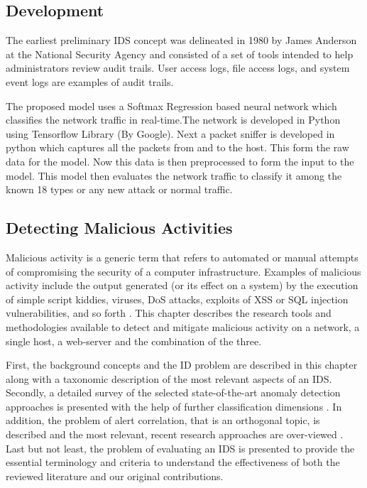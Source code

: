 \documentclass[12pt]{article}
\theoremstyle{definition}
\begin{document}
		
		\subsection{Development}
		The earliest preliminary IDS concept was delineated in 1980 by James Anderson at the National Security Agency and consisted of a set of tools intended to help administrators review audit trails. User access logs, file access logs, and system event logs are examples of audit trails.
		
		The proposed model uses a Softmax Regression based neural network which classifies the network traffic in real-time.The network is developed in Python using Tensorflow Library (By Google). Next a packet sniffer is developed in python which captures all the packets from and to the host. This form the raw data for the model. Now this data is then preprocessed to form the input to the model. This model then evaluates the network traffic to classify it among the known 18 types or any new attack or normal traffic.
			
		\subsection{Detecting Malicious Activities}
		Malicious activity is a generic term that refers to automated or manual attempts of compromising the security of a computer infrastructure. Examples of malicious activity include the output generated (or its effect on a system) by the execution of simple script kiddies, viruses, DoS attacks, exploits of XSS or SQL injection vulnerabilities, and so forth \cite{Zarpelao2017}. This chapter describes the research tools and methodologies available to detect and
		mitigate malicious activity on a network, a single host, a web-server and the combination of the three.
		
		First, the background concepts and the ID problem are described in this chapter along with a taxonomic description of the most relevant aspects of an IDS. Secondly, a detailed survey of the selected state-of-the-art anomaly detection approaches is presented with the help of further classification dimensions \cite{Saxena2016}. In addition, the problem of alert correlation, that is an orthogonal topic, is described and the most relevant, recent research approaches are over-viewed \cite{So-In2016}. Last but not least, the problem of evaluating an IDS is presented to provide the essential terminology and criteria to understand the effectiveness of both the reviewed literature and our original contributions.
		
\end{document}
